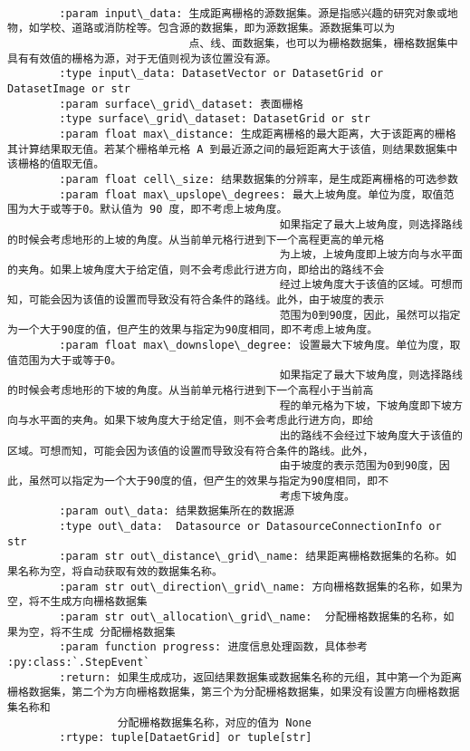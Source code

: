 \documentclass[11pt]{article}
\begin{document}
\begin{Verbatim}[commandchars=\\\{\}]
        
        :param input\_data: 生成距离栅格的源数据集。源是指感兴趣的研究对象或地物，如学校、道路或消防栓等。包含源的数据集，即为源数据集。源数据集可以为
                            点、线、面数据集，也可以为栅格数据集，栅格数据集中具有有效值的栅格为源，对于无值则视为该位置没有源。
        :type input\_data: DatasetVector or DatasetGrid or DatasetImage or str
        :param surface\_grid\_dataset: 表面栅格
        :type surface\_grid\_dataset: DatasetGrid or str
        :param float max\_distance: 生成距离栅格的最大距离，大于该距离的栅格其计算结果取无值。若某个栅格单元格 A 到最近源之间的最短距离大于该值，则结果数据集中该栅格的值取无值。
        :param float cell\_size: 结果数据集的分辨率，是生成距离栅格的可选参数
        :param float max\_upslope\_degrees: 最大上坡角度。单位为度，取值范围为大于或等于0。默认值为 90 度，即不考虑上坡角度。
                                          如果指定了最大上坡角度，则选择路线的时候会考虑地形的上坡的角度。从当前单元格行进到下一个高程更高的单元格
                                          为上坡，上坡角度即上坡方向与水平面的夹角。如果上坡角度大于给定值，则不会考虑此行进方向，即给出的路线不会
                                          经过上坡角度大于该值的区域。可想而知，可能会因为该值的设置而导致没有符合条件的路线。此外，由于坡度的表示
                                          范围为0到90度，因此，虽然可以指定为一个大于90度的值，但产生的效果与指定为90度相同，即不考虑上坡角度。
        :param float max\_downslope\_degree: 设置最大下坡角度。单位为度，取值范围为大于或等于0。
                                          如果指定了最大下坡角度，则选择路线的时候会考虑地形的下坡的角度。从当前单元格行进到下一个高程小于当前高
                                          程的单元格为下坡，下坡角度即下坡方向与水平面的夹角。如果下坡角度大于给定值，则不会考虑此行进方向，即给
                                          出的路线不会经过下坡角度大于该值的区域。可想而知，可能会因为该值的设置而导致没有符合条件的路线。此外，
                                          由于坡度的表示范围为0到90度，因此，虽然可以指定为一个大于90度的值，但产生的效果与指定为90度相同，即不
                                          考虑下坡角度。
        :param out\_data: 结果数据集所在的数据源
        :type out\_data:  Datasource or DatasourceConnectionInfo or str
        :param str out\_distance\_grid\_name: 结果距离栅格数据集的名称。如果名称为空，将自动获取有效的数据集名称。
        :param str out\_direction\_grid\_name: 方向栅格数据集的名称，如果为空，将不生成方向栅格数据集
        :param str out\_allocation\_grid\_name:  分配栅格数据集的名称，如果为空，将不生成 分配栅格数据集
        :param function progress: 进度信息处理函数，具体参考 :py:class:`.StepEvent`
        :return: 如果生成成功，返回结果数据集或数据集名称的元组，其中第一个为距离栅格数据集，第二个为方向栅格数据集，第三个为分配栅格数据集，如果没有设置方向栅格数据集名称和
                 分配栅格数据集名称，对应的值为 None
        :rtype: tuple[DataetGrid] or tuple[str]
    

\end{Verbatim}
\end{document}
